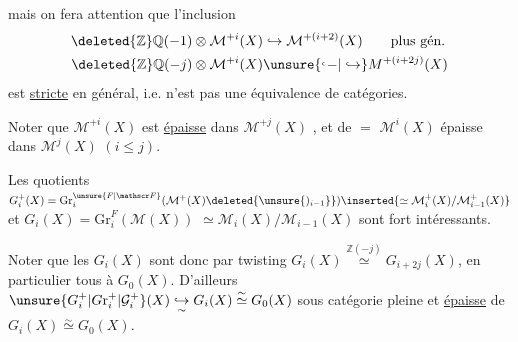 mais on fera attention que l'inclusion %
\[
\begin{aligned}
\deleted{\mathbb Z}\mathbb Q(-1)\otimes\mathcal M^{+i}(X)&\hookrightarrow\mathcal M^{+(i+2)}(X)\qquad\text{plus gén.}\\ %
\deleted{\mathbb Z}\mathbb Q(-j)\otimes\mathcal M^{+i}(X)&\unsure{\lhook\joinrel-|\hookrightarrow}M^{+(i+2j)}(X) %
\end{aligned}
\]
est \uline{stricte} en général, i.e. n'est pas %
une équivalence de catégories. %

Noter que $\mathcal M^{+i}(X)$ est \uline{épaisse} dans $\mathcal M^{+j}(X)$ %
\deleted{[elle est définie, dans la catégorie}, et de %
$=$ $\mathcal M^i(X)$ épaisse dans $\mathcal M^j(X)$ $(i\leq j)$. %

Les quotients $G_i^+(X)=\mathrm{Gr}^{\unsure{F|\mathscr F}}_i(\mathcal M^+(X)\deleted{\unsure{)_{i-1}}})\inserted{\simeq\mathcal M_i^+(X)/\mathcal M_{i-1}^+(X)}$ et $G_i(X)=\mathrm{Gr}^{F}_i(\mathcal M(X))$ %
$\simeq\mathcal M_i(X)/\mathcal M_{i-1}(X)$ sont fort intéressants. %

Noter que les $G_i(X)$ sont donc   %
par twisting $G_i(X)\overset{\mathbb Z(-j)}{\simeq}G_{i+2j}(X)$, en %
particulier tous   à $G_0(X)$. %
D'ailleurs $\unsure{G_i^+|G\mathrm r_i^+|\mathcal G_i^+}(X)\underset{\sim}{\hookrightarrow}G_i(X)\overset{\sim}{\simeq}G_0(X)$ %
 sous catégorie pleine et \uline{épaisse} de $G_i(X)\overset{\sim}{\simeq} %
G_0(X)$. %

